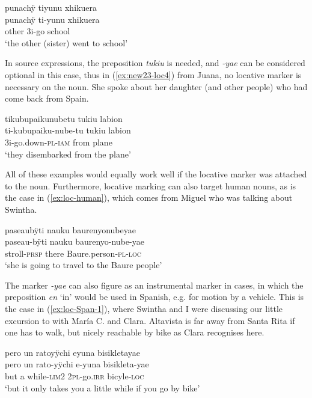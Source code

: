 \ea\label{ex:new23-loc3}
\begingl
\glpreamble punachÿ tiyunu xhikuera\\
\gla punachÿ ti-yunu xhikuera\\
\glb other 3i-go school\\
\glft ‘the other (sister) went to school’
\endgl
\trailingcitation{[cux-120410ls.220]}
\xe

In source expressions, the preposition \textit{tukiu} is needed, and \textit{-yae} can be considered optional in this case, thus in (\ref{ex:new23-loc4}) from Juana, no locative marker is necessary on the noun. She spoke about her daughter (and other people) who had come back from Spain.

\ea\label{ex:new23-loc4}
\begingl
\glpreamble tikubupaikunubetu tukiu labion\\
\gla ti-kubupaiku-nube-tu tukiu labion\\
\glb 3i-go.down-\textsc{pl}-\textsc{iam} from plane\\
\glft ‘they disembarked from the plane’
\endgl
\trailingcitation{[jxx-p120430l-1.266]}
\xe
{}


All of these examples would equally work well if the locative marker was attached to the noun. Furthermore, locative marking can also target human nouns, as is the case in (\ref{ex:loc-human}), which comes from Miguel who was talking about Swintha.

\ea\label{ex:loc-human}
\begingl
\glpreamble paseaubÿti nauku baurenyonubeyae\\
\gla paseau-bÿti nauku baurenyo-nube-yae\\
\glb stroll-\textsc{prsp} there Baure.person-\textsc{pl}-\textsc{loc}\\
\glft ‘she is going to travel to the Baure people’
\endgl
\trailingcitation{[mxx-d110813s-2.066]}
\xe

The marker \textit{-yae} can also figure as an instrumental marker in cases, in which the preposition \textit{en} ‘in’ would be used in Spanish, e.g. for motion by a vehicle. This is the case in (\ref{ex:loc-Span-1}), where Swintha and I were discussing our little excursion to  with María C. and Clara. Altavista is far away from Santa Rita if one has to walk, but nicely reachable by bike as Clara recognises here.

\ea\label{ex:loc-Span-1}
\begingl
\glpreamble pero un ratoyÿchi eyuna bisikletayae\\
\gla pero {un rato}-yÿchi e-yuna bisikleta-yae\\
\glb but {a while}-\textsc{lim}2 2\textsc{pl}-go.\textsc{irr} bicyle-\textsc{loc}\\
\glft ‘but it only takes you a little while if you go by bike’
\endgl
\trailingcitation{[cux-c120414ls-1.155]}
\xe

